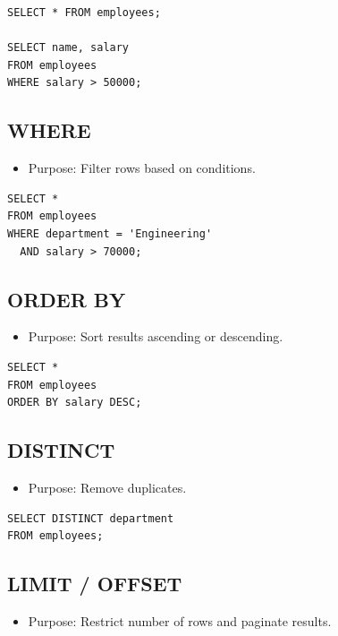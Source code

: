 \documentclass[10pt]{article}
\begin{document}
\begin{verbatim}
SELECT * FROM employees;

SELECT name, salary
FROM employees
WHERE salary > 50000;
\end{verbatim}

\subsection{WHERE}
\begin{itemize}
    \item Purpose: Filter rows based on conditions.
\end{itemize}

\begin{verbatim}
SELECT *
FROM employees
WHERE department = 'Engineering'
  AND salary > 70000;
\end{verbatim}

\subsection{ORDER BY}
\begin{itemize}
    \item Purpose: Sort results ascending or descending.
\end{itemize}

\begin{verbatim}
SELECT *
FROM employees
ORDER BY salary DESC;
\end{verbatim}

\subsection{DISTINCT}
\begin{itemize}
    \item Purpose: Remove duplicates.
\end{itemize}

\begin{verbatim}
SELECT DISTINCT department
FROM employees;
\end{verbatim}

\subsection{LIMIT / OFFSET}
\begin{itemize}
    \item Purpose: Restrict number of rows and paginate results.
\end{itemize}
\end{document}
